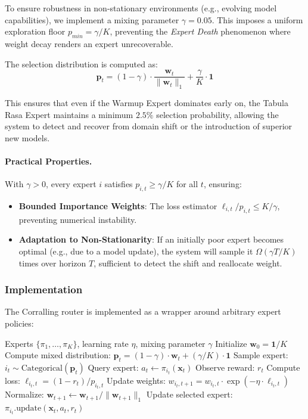To ensure robustness in non-stationary environments (e.g., evolving model capabilities), we implement a mixing parameter $\gamma=0.05$. This imposes a uniform exploration floor $p_{min} = \gamma/K$, preventing the \textit{Expert Death} phenomenon where weight decay renders an expert unrecoverable.

The selection distribution is computed as:
\begin{equation}
    \mathbf{p}_t = (1-\gamma) \cdot \frac{\mathbf{w}_t}{\|\mathbf{w}_t\|_1} + \frac{\gamma}{K} \cdot \mathbf{1}
\end{equation}

This ensures that even if the Warmup Expert dominates early on, the Tabula Rasa Expert maintains a minimum $2.5\%$ selection probability, allowing the system to detect and recover from domain shift or the introduction of superior new models.

\paragraph{Practical Properties.} With $\gamma > 0$, every expert $i$ satisfies $p_{i,t} \geq \gamma/K$ for all $t$, ensuring:
\begin{itemize}
    \item \textbf{Bounded Importance Weights}: The loss estimator $\ell_{i,t}/p_{i,t} \leq K/\gamma$, preventing numerical instability.
    \item \textbf{Adaptation to Non-Stationarity}: If an initially poor expert becomes optimal (e.g., due to a model update), the system will sample it $\Omega(\gamma T / K)$ times over horizon $T$, sufficient to detect the shift and reallocate weight.
\end{itemize}

\subsubsection{Implementation}
The Corralling router is implemented as a wrapper around arbitrary expert policies:

\begin{algorithm}[t]
\caption{Corralling with Mixing Parameter}
\label{alg:corralling}
\begin{algorithmic}[1]
\Require Experts $\{\pi_1, \ldots, \pi_K\}$, learning rate $\eta$, mixing parameter $\gamma$
\State Initialize $\mathbf{w}_0 = \mathbf{1} / K$ 
    \State Compute mixed distribution: $\mathbf{p}_t = (1-\gamma) \cdot \mathbf{w}_t + (\gamma/K) \cdot \mathbf{1}$
    \State Sample expert: $i_t \sim \text{Categorical}(\mathbf{p}_t)$
    \State Query expert: $a_t \gets \pi_{i_t}(\mathbf{x}_t)$
    \State Observe reward: $r_t$
    \State Compute loss: $\ell_{i_t, t} = (1 - r_t) / p_{i_t, t}$ 
    \State Update weights: $w_{i_t, t+1} = w_{i_t, t} \cdot \exp(-\eta \cdot \ell_{i_t, t})$
    \State Normalize: $\mathbf{w}_{t+1} \gets \mathbf{w}_{t+1} / \|\mathbf{w}_{t+1}\|_1$
    \State Update selected expert: $\pi_{i_t}.\text{update}(\mathbf{x}_t, a_t, r_t)$
\EndFor
\end{algorithmic}
\end{algorithm}

